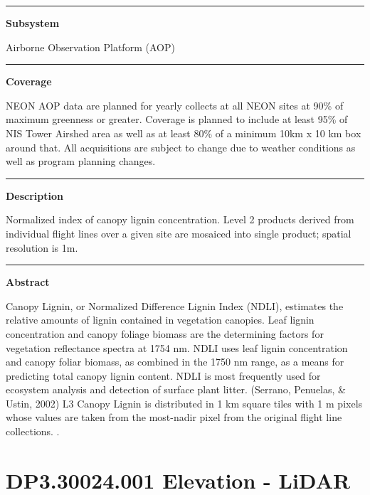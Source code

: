 \documentclass[]{article}
\begin{document}
\begin{center}\rule{0.5\linewidth}{\linethickness}\end{center}

\textbf{Subsystem}

Airborne Observation Platform (AOP)

\begin{center}\rule{0.5\linewidth}{\linethickness}\end{center}

\textbf{Coverage}

NEON AOP data are planned for yearly collects at all NEON sites at 90\%
of maximum greenness or greater. Coverage is planned to include at least
95\% of NIS Tower Airshed area as well as at least 80\% of a minimum
10km x 10 km box around that. All acquisitions are subject to change due
to weather conditions as well as program planning changes.

\begin{center}\rule{0.5\linewidth}{\linethickness}\end{center}

\textbf{Description}

Normalized index of canopy lignin concentration. Level 2 products
derived from individual flight lines over a given site are mosaiced into
single product; spatial resolution is 1m.

\begin{center}\rule{0.5\linewidth}{\linethickness}\end{center}

\textbf{Abstract}

Canopy Lignin, or Normalized Difference Lignin Index (NDLI), estimates
the relative amounts of lignin contained in vegetation canopies. Leaf
lignin concentration and canopy foliage biomass are the determining
factors for vegetation reflectance spectra at 1754 nm. NDLI uses leaf
lignin concentration and canopy foliar biomass, as combined in the 1750
nm range, as a means for predicting total canopy lignin content. NDLI is
most frequently used for ecosystem analysis and detection of surface
plant litter. (Serrano, Penuelas, \& Ustin, 2002) L3 Canopy Lignin is
distributed in 1 km square tiles with 1 m pixels whose values are taken
from the most-nadir pixel from the original flight line collections.
\newpage
.

\section{DP3.30024.001 Elevation -
LiDAR}\label{dp3.30024.001-elevation---lidar}
\end{document}
